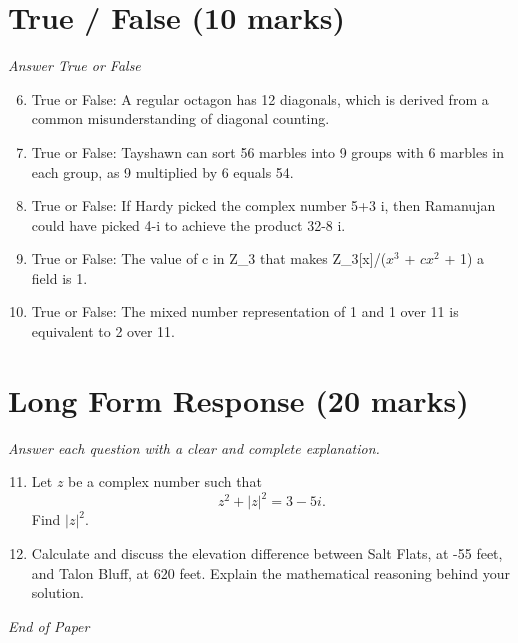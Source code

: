 \documentclass[12pt]{article}
\begin{document}
\section*{True / False (10 marks)}
\textit{Answer True or False}
\begin{enumerate}[label=\arabic*.]
\setcounter{enumi}{5}
\item True or False: A regular octagon has 12 diagonals, which is derived from a common misunderstanding of diagonal counting.
\item True or False: Tayshawn can sort 56 marbles into 9 groups with 6 marbles in each group, as 9 multiplied by 6 equals 54.
\item True or False: If Hardy picked the complex number 5+3 i, then Ramanujan could have picked 4-i to achieve the product 32-8 i.
\item True or False: The value of c in Z\_3 that makes Z\_3[x]/($x^3$ + $cx^2$ + 1) a field is 1.
\item True or False: The mixed number representation of 1 and 1 over 11 is equivalent to 2 over 11.
\end{enumerate}

\section*{Long Form Response (20 marks)}
\textit{Answer each question with a clear and complete explanation.}
\begin{enumerate}[label=\arabic*.]
\setcounter{enumi}{10}
\item Let $z$ be a complex number such that \[z^2 + |z|^2 = 3 - 5 i.\]Find $|z|^2.$
\item Calculate and discuss the elevation difference between Salt Flats, at -55 feet, and Talon Bluff, at 620 feet. Explain the mathematical reasoning behind your solution.
\end{enumerate}

\vfill
\noindent\textit{End of Paper}
\end{document}
